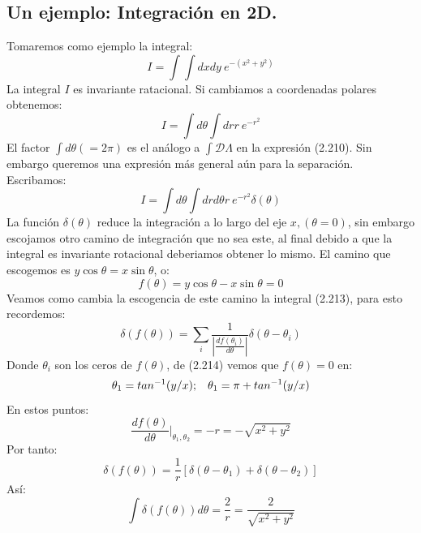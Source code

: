 \subsection{Un ejemplo: Integración en 2D.}
Tomaremos como ejemplo la integral:
\begin{equation}
I=\int \int dxdy\ e^{-(x^2+y^2)}
\end{equation}
La integral $I$ es invariante ratacional. Si cambiamos a coordenadas polares obtenemos:
\begin{equation}
I=\int d\theta \int dr r\ e^{-r^2}
\end{equation}
El factor $\int d\theta(=2\pi)$ es el análogo a $\int\mathcal{D}\Lambda$ en la expresión (2.210). Sin embargo queremos una expresión más general aún para la separación. Escribamos:
\begin{equation}
I=\int d\theta \int drd\theta r\ e^{-r^2} \delta(\theta)
\end{equation}  
La función $\delta(\theta)$ reduce la integración a lo largo del eje $x, (\theta=0)$, sin embargo escojamos otro camino de integración que no sea este, al final debido a que la integral es invariante rotacional deberiamos obtener lo mismo. El camino que escogemos es $y\cos\theta=x\sin\theta$, o:
\begin{equation}
f(\theta)=y\cos\theta-x\sin\theta=0
\end{equation}
Veamos como cambia la escogencia de este camino la integral (2.213), para esto recordemos:
\begin{equation}
\delta(f(\theta))=\sum_{i}\frac{1}{|\frac{df(\theta_{i})}{d\theta}|}\delta(\theta-\theta_{i})
\end{equation}
Donde $\theta_i$ son los ceros de $f(\theta)$, de (2.214) vemos que $f(\theta)=0$ en:
\begin{equation}
\theta_1=tan^{-1}(y/x); \hspace{0.3cm} \theta_1=\pi+tan^{-1}(y/x)
\end{equation} 
En estos puntos:
\begin{equation}
\frac{df(\theta)}{d\theta}|_{\theta_{1},\theta_{2}}=-r=-\sqrt{x^{2}+y^{2}}
\end{equation}
Por tanto:
\begin{equation}
\delta(f(\theta))=\frac{1}{r}\left[\delta(\theta-\theta_{1})+\delta(\theta-\theta_{2})\right]
\end{equation}
Así:
\begin{equation}
\int\delta(f(\theta))d\theta=\frac{2}{r}=\frac{2}{\sqrt{x^{2}+y^{2}}}
\end{equation}

